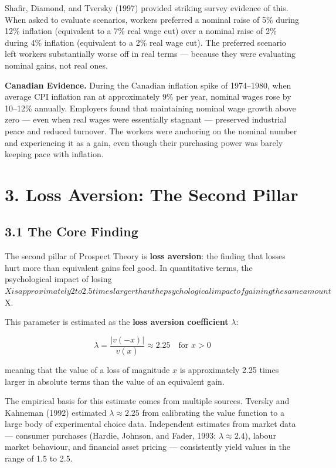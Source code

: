 \documentclass[12pt, letterpaper]{article}
\begin{document}
Shafir, Diamond, and Tversky (1997) provided striking survey evidence of this. When asked to evaluate scenarios, workers preferred a nominal raise of 5\% during 12\% inflation (equivalent to a 7\% real wage cut) over a nominal raise of 2\% during 4\% inflation (equivalent to a 2\% real wage cut). The preferred scenario left workers substantially worse off in real terms --- because they were evaluating nominal gains, not real ones.

\textbf{Canadian Evidence.} During the Canadian inflation spike of 1974--1980, when average CPI inflation ran at approximately 9\% per year, nominal wages rose by 10--12\% annually. Employers found that maintaining nominal wage growth above zero --- even when real wages were essentially stagnant --- preserved industrial peace and reduced turnover. The workers were anchoring on the nominal number and experiencing it as a gain, even though their purchasing power was barely keeping pace with inflation.

\medskip


\section{3. Loss Aversion: The Second Pillar}



\subsection{3.1 The Core Finding}


The second pillar of Prospect Theory is \textbf{loss aversion}: the finding that losses hurt more than equivalent gains feel good. In quantitative terms, the psychological impact of losing $X is approximately 2 to 2.5 times larger than the psychological impact of gaining the same amount $X.

This parameter is estimated as the \textbf{loss aversion coefficient} $\lambda$:

$$\lambda = \frac{|v(-x)|}{v(x)} \approx 2.25 \quad \text{for } x > 0$$

meaning that the value of a loss of magnitude $x$ is approximately 2.25 times larger in absolute terms than the value of an equivalent gain.

The empirical basis for this estimate comes from multiple sources. Tversky and Kahneman (1992) estimated $\lambda \approx 2.25$ from calibrating the value function to a large body of experimental choice data. Independent estimates from market data --- consumer purchases (Hardie, Johnson, and Fader, 1993: $\lambda \approx 2.4$), labour market behaviour, and financial asset pricing --- consistently yield values in the range of 1.5 to 2.5.
\end{document}
